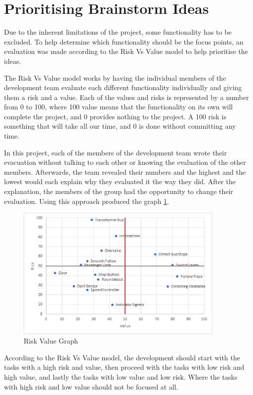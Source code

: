 \section{Prioritising Brainstorm Ideas}

Due to the inherent limitations of the project, some functionality has to be excluded. To help determine which functionality should be the focus points, an evaluation was made according to the Risk Vs Value model to help prioritise the ideas. 

The Risk Vs Value model works by having the individual members of the development team evaluate each different functionality individually and giving them a risk and a value. Each of the values and risks is represented by a number from 0 to 100, where 100 value means that the functionality on its own will complete the project, and 0 provides nothing to the project. A 100 risk is something that will take all our time, and 0 is done without committing any time. 

In this project, each of the members of the development team wrote their evacuation without talking to each other or knowing the evaluation of the other members. Afterwards, the team revealed their numbers and the highest and the lowest would each explain why they evaluated it the way they did. After the explanation, the members of the group had the opportunity to change their evaluation. Using this approach produced the graph \ref{fig:RiskValueGraph}.

\begin{figure}[!h]
    \centering
	\includegraphics[width=0.9\textwidth]{Images/Graphs/RiskValue.png}
    \caption{Risk Value Graph}
    \label{fig:RiskValueGraph}
\end{figure}

According to the Risk Vs Value model, the development should start with the tasks with a high risk and value, then proceed with the tasks with low risk and high value, and lastly the tasks with low value and low risk. Where the tasks with high risk and low value should not be focused at all. 

